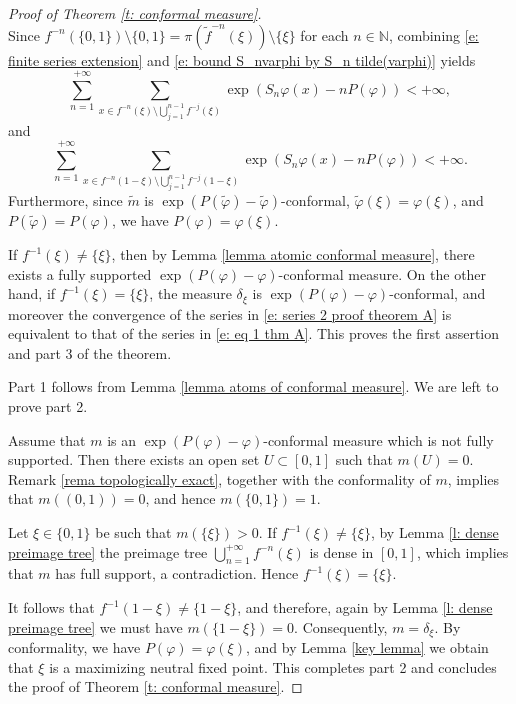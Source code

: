 \documentclass[12pt]{amsart}
\numberwithin{equation}{section} %
\numberwithin{figure}{section} %
\theoremstyle{plain}
\theoremstyle{definition}
\theoremstyle{remark}
\theoremstyle{citing}
\newcommand{\N}{\mathbb{N}}
\renewcommand{\=}{\coloneqq}
\begin{document}
\begin{proof}[Proof of Theorem \ref{t: conformal measure}]
\begin{equation}
\end{equation}
Since $f^{-n}(\{0,1\})\setminus\{0,1\} = \pi(\widetilde{f}^{-n}(\xi))\setminus\{\xi\}$ for each $n\in \N$,
combining \eqref{e: finite series extension} and \eqref{e: bound S_nvarphi by S_n tilde(varphi)} yields
\begin{equation*}
     \sum_{n=1}^{+\infty}\sum_{x\in f^{-n}(\xi)\setminus\bigcup_{j=1}^{n-1}f^{-j}(\xi)} \exp(S_n\varphi(x) - nP(\varphi)) <+\infty,
\end{equation*}
and
\begin{equation}\label{e: series 2 proof theorem A}
     \sum_{n=1}^{+\infty}\sum_{x\in f^{-n}(1-\xi)\setminus\bigcup_{j=1}^{n-1}f^{-j}(1-\xi)} \exp(S_n\varphi(x) - nP(\varphi)) <+\infty.
\end{equation}
Furthermore, since $\widetilde{m}$ is $\exp(P(\widetilde\varphi)-\widetilde{\varphi})$-conformal, $\widetilde{\varphi}(\xi)=\varphi(\xi)$, and $P(\widetilde\varphi) = P(\varphi)$, we have $P(\varphi)= \varphi(\xi)$.

If $f^{-1}(\xi)\neq \{\xi\}$, then by Lemma \ref{lemma atomic conformal measure}, there exists a fully supported $\exp(P(\varphi)- \varphi)$-conformal measure. On the other hand, if $f^{-1}(\xi)=\{\xi\}$, the measure $\delta_{\xi}$ is $\exp(P(\varphi)-\varphi)$-conformal, and moreover the convergence of the series in \eqref{e: series 2 proof theorem A} is equivalent to that of the series in \eqref{e: eq 1 thm A}. This proves the first assertion and part 3 of the theorem.

Part 1 follows from Lemma \ref{lemma atoms of conformal measure}. We are left to prove part 2.

Assume that $m$ is an $\exp(P(\varphi)-\varphi)$-conformal measure which is not fully supported. Then there exists an open set $U\subset [0,1]$ such that $m(U)=0$. Remark \ref{rema topologically exact}, together with the conformality of $m$, implies that $m((0,1))=0$, and hence $m(\{0,1\})=1$.

Let $\xi \in \{0,1\}$ be such that $m(\{\xi\})>0$. If $f^{-1}(\xi) \neq \{\xi\}$, by Lemma \ref{l: dense preimage tree} the preimage tree $\bigcup_{n=1}^{+\infty} f^{-n}(\xi)$ is dense in $[0,1]$, which implies that $m$ has full support, a contradiction. Hence $f^{-1}(\xi)=\{\xi\}$.

It follows that $f^{-1}(1-\xi) \neq \{1-\xi\}$, and therefore, again by Lemma \ref{l: dense preimage tree} we must have $m(\{1-\xi\})=0$. Consequently, $m=\delta_{\xi}$. By conformality, we have $P(\varphi)= \varphi(\xi)$, and by Lemma \ref{key lemma} we obtain that $\xi$ is a maximizing neutral fixed point. This completes part 2 and concludes the proof of Theorem \ref{t: conformal measure}.
\end{proof}
\end{document}
